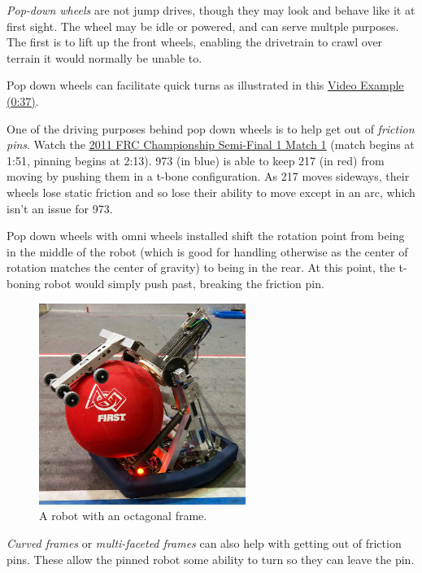 \textit{Pop-down wheels} are not jump drives, though they may look and behave like it at first sight. The wheel may be idle or powered, and can serve multple purposes. The first is to lift up the front wheels, enabling the drivetrain to crawl over terrain it would normally be unable to.

Pop down wheels can facilitate quick turns as illustrated in this \href{https://youtu.be/PtRewwr59d8?t=37}{\color{red}\underline{Video Example (0:37)}}.

One of the driving purposes behind pop down wheels is to help get out of \textit{friction pins}. Watch the \href{https://youtu.be/kLAkcn6l9v0?t=133}{\color{red}\underline{2011 FRC Championship Semi-Final 1 Match 1}} (match begins at 1:51, pinning begins at 2:13). 973 (in blue) is able to keep 217 (in red) from moving by pushing them in a t-bone configuration. As 217 moves sideways, their wheels lose static friction and so lose their ability to move except in an arc, which isn't an issue for 973.

Pop down wheels with omni wheels installed shift the rotation point from being in the middle of the robot (which is good for handling otherwise as the center of rotation matches the center of gravity) to being in the rear. At this point, the t-boning robot would simply push past, breaking the friction pin.

\begin{figure}[H]
	\includegraphics[width=0.6\textwidth]{imgs/drivetrain_octagon.png}
	\caption{A robot with an octagonal frame.}
\end{figure}

\textit{Curved frames} or \textit{multi-faceted frames} can also help with getting out of friction pins. These allow the pinned robot some ability to turn so they can leave the pin.

